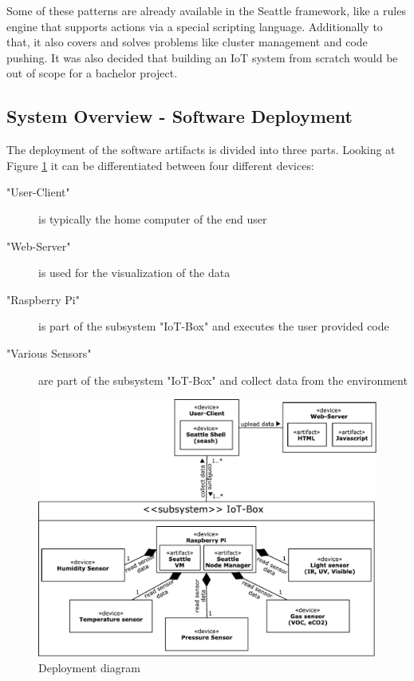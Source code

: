 \documentclass[bachelorthesis, grey, english]{mas-thesis-chapters} %
\begin{document}
Some of these patterns are already available in the Seattle framework, like a rules engine that supports actions via a special scripting language. Additionally to that, it also covers and solves problems like cluster management and code pushing. It was also decided that building an \gls{IoT} system from scratch would be out of scope for a bachelor project.

\subsection{System Overview - Software Deployment}

The deployment of the software artifacts is divided into three parts. Looking at Figure \ref{fig:deployment} it can be 
differentiated between four different devices: 
\begin{description}
\item["User-Client"]
is typically the home computer of the end user
\item["Web-Server"]
is used for the visualization of the data
\item["Raspberry Pi"]
is part of the subsystem "\gls{IoT}-Box" and executes the user provided code 
\item["Various Sensors"]
are part of the subsystem "\gls{IoT}-Box" and collect data from the environment
\end{description}

\begin{figure}[ht]
	\centering
	\includegraphics[width=13.5cm]{Deployment_diagram.pdf}
	\caption{Deployment diagram}
	\label{fig:deployment}
\end{figure}
\end{document}
